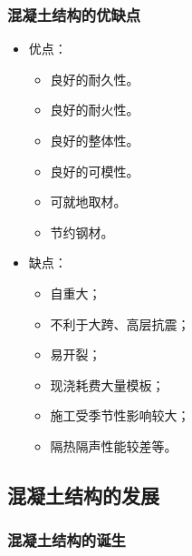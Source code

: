 \documentclass{article}
\begin{document}
\subsubsection{混凝土结构的优缺点}
\begin{itemize}
    \item 优点：
          \begin{itemize}
              \item 良好的耐久性。
              \item 良好的耐火性。
              \item 良好的整体性。
              \item 良好的可模性。
              \item 可就地取材。
              \item 节约钢材。
          \end{itemize}
    \item 缺点：
          \begin{itemize}
              \item 自重大；
              \item 不利于大跨、高层抗震；
              \item 易开裂；
              \item 现浇耗费大量模板；
              \item 施工受季节性影响较大；
              \item 隔热隔声性能较差等。
          \end{itemize}
\end{itemize}
\subsection{混凝土结构的发展}
\subsubsection{混凝土结构的诞生}
\end{document}
